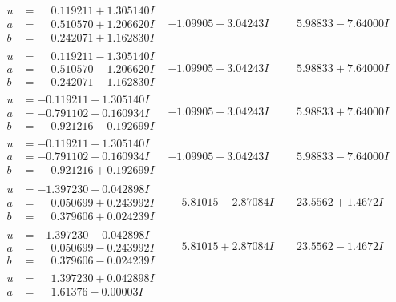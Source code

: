 \documentclass[1p]{elsarticle_modified}
\theoremstyle{definition}
\begin{document}
$$\begin{array}{c|c|c}
\begin{aligned}
u &= \phantom{-}0.119211 + 1.305140 I \\
a &= \phantom{-}0.510570 + 1.206620 I \\
b &= \phantom{-}0.242071 + 1.162830 I\end{aligned}
 & -1.09905 + 3.04243 I & \phantom{-}5.98833 - 7.64000 I \\ \hline\begin{aligned}
u &= \phantom{-}0.119211 - 1.305140 I \\
a &= \phantom{-}0.510570 - 1.206620 I \\
b &= \phantom{-}0.242071 - 1.162830 I\end{aligned}
 & -1.09905 - 3.04243 I & \phantom{-}5.98833 + 7.64000 I \\ \hline\begin{aligned}
u &= -0.119211 + 1.305140 I \\
a &= -0.791102 - 0.160934 I \\
b &= \phantom{-}0.921216 - 0.192699 I\end{aligned}
 & -1.09905 - 3.04243 I & \phantom{-}5.98833 + 7.64000 I \\ \hline\begin{aligned}
u &= -0.119211 - 1.305140 I \\
a &= -0.791102 + 0.160934 I \\
b &= \phantom{-}0.921216 + 0.192699 I\end{aligned}
 & -1.09905 + 3.04243 I & \phantom{-}5.98833 - 7.64000 I \\ \hline\begin{aligned}
u &= -1.397230 + 0.042898 I \\
a &= \phantom{-}0.050699 + 0.243992 I \\
b &= \phantom{-}0.379606 + 0.024239 I\end{aligned}
 & \phantom{-}5.81015 - 2.87084 I & \phantom{-}23.5562 + 1.4672 I \\ \hline\begin{aligned}
u &= -1.397230 - 0.042898 I \\
a &= \phantom{-}0.050699 - 0.243992 I \\
b &= \phantom{-}0.379606 - 0.024239 I\end{aligned}
 & \phantom{-}5.81015 + 2.87084 I & \phantom{-}23.5562 - 1.4672 I \\ \hline\begin{aligned}
u &= \phantom{-}1.397230 + 0.042898 I \\
a &= \phantom{-}1.61376 - 0.00003 I \\

\end{aligned}
\end{array}$$
\end{document}
